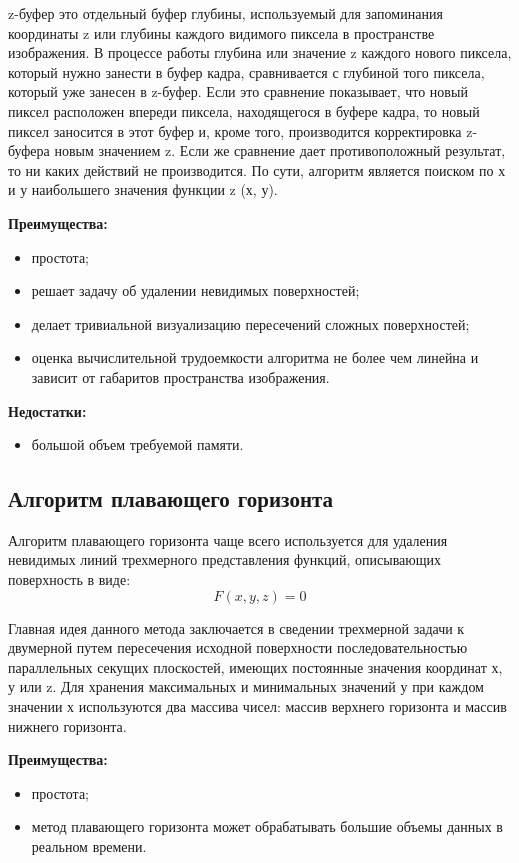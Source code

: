 z-буфер это отдельный буфер глубины, используемый для запоминания координаты z или глубины каждого видимого пиксела в пространстве изображения. В процессе работы глубина или значение z каждого нового пиксела, который нужно занести в буфер кадра, сравнивается с глубиной того пиксела, который уже занесен в z-буфер. Если это сравнение показывает, что новый пиксел расположен впереди пиксела, находящегося в буфере кадра, то новый пиксел заносится в этот буфер и, кроме того, производится корректировка z-буфера новым значением z. Если же сравнение дает противоположный результат, то ни каких действий не производится. По сути, алгоритм является поиском по х и у наибольшего значения функции z (х, у).

\textbf{Преимущества:}
\begin{itemize}
	\item простота;
	\item решает задачу об удалении невидимых поверхностей;
	\item делает тривиальной визуализацию пересечений сложных поверхностей;
	\item оценка вычислительной трудоемкости алгоритма не более чем линейна и зависит от габаритов пространства изображения.
\end{itemize}

\textbf{Недостатки:}
\begin{itemize}
	\item большой объем требуемой памяти.
\end{itemize}
\subsection{Алгоритм плавающего горизонта}
Алгоритм плавающего горизонта чаще всего используется для удаления невидимых линий трехмерного представления функций, описывающих поверхность в виде:
\[
F(x, y, z) = 0
\]

Главная идея данного метода заключается в сведении трехмерной задачи к двумерной путем пересечения исходной поверхности последовательностью параллельных секущих плоскостей, имеющих постоянные значения координат х, у или z. Для хранения максимальных и минимальных значений у при каждом значении х используются два массива чисел: массив верхнего горизонта и массив нижнего горизонта.

\textbf{Преимущества:}
\begin{itemize}
	\item простота;
	\item метод плавающего горизонта может обрабатывать большие объемы данных в реальном времени.
\end{itemize}


